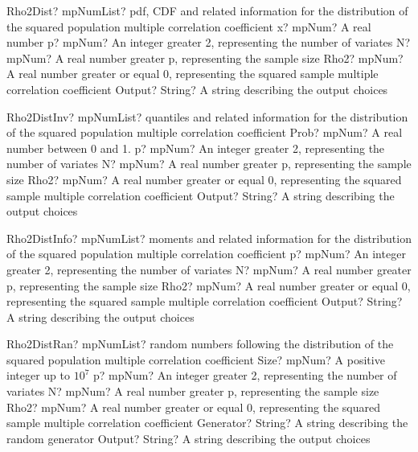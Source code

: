 \documentclass[12pt,a4paper,openany]{book}
\begin{document}
\begin{mpFunctionsExtract}
\mpFunctionFiveNotImplemented
{Rho2Dist? mpNumList? pdf, CDF and related information for the distribution of the squared population multiple correlation coefficient}
{x? mpNum? A real number}
{p? mpNum? An integer greater 2, representing the number of variates}
{N? mpNum? A real number greater p, representing the sample size}
{Rho2? mpNum? A real number greater or equal 0, representing the squared sample multiple correlation coefficient}
{Output? String? A string describing the output choices}
\end{mpFunctionsExtract}

\begin{mpFunctionsExtract}
\mpFunctionFiveNotImplemented
{Rho2DistInv? mpNumList? quantiles and related information for the distribution of the squared population multiple correlation coefficient}
{Prob? mpNum? A real number between 0 and 1.}
{p? mpNum? An integer greater 2, representing the number of variates}
{N? mpNum? A real number greater p, representing the sample size}
{Rho2? mpNum? A real number greater or equal 0, representing the squared sample multiple correlation coefficient}
{Output? String? A string describing the output choices}
\end{mpFunctionsExtract}

\begin{mpFunctionsExtract}
\mpFunctionFourNotImplemented
{Rho2DistInfo? mpNumList? moments and related information for the distribution of the squared population multiple correlation coefficient}
{p? mpNum? An integer greater 2, representing the number of variates}
{N? mpNum? A real number greater p, representing the sample size}
{Rho2? mpNum? A real number greater or equal 0, representing the squared sample multiple correlation coefficient}
{Output? String? A string describing the output choices}
\end{mpFunctionsExtract}

\begin{mpFunctionsExtract}
\mpFunctionSixNotImplemented
{Rho2DistRan? mpNumList? random numbers following the distribution of the squared population multiple correlation coefficient}
{Size? mpNum? A positive integer up to $10^7$}
{p? mpNum? An integer greater 2, representing the number of variates}
{N? mpNum? A real number greater p, representing the sample size}
{Rho2? mpNum? A real number greater or equal 0, representing the squared sample multiple correlation coefficient}
{Generator? String? A string describing the random generator}
{Output? String? A string describing the output choices}
\end{mpFunctionsExtract}
\end{document}
